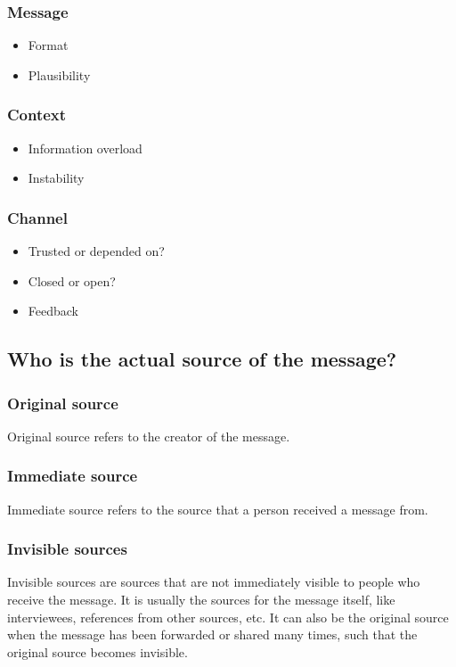 \documentclass[11pt]{article}
\begin{document}
\subsubsection{Message}
\label{sec:org92cbc2b}
\begin{itemize}
\item Format
\item Plausibility
\end{itemize}

\subsubsection{Context}
\label{sec:orgc5d2cc6}
\begin{itemize}
\item Information overload
\item Instability
\end{itemize}

\subsubsection{Channel}
\label{sec:org3faadb5}
\begin{itemize}
\item Trusted or depended on?
\item Closed or open?
\item Feedback
\end{itemize}

\subsection{Who is the actual source of the message?}
\label{sec:orga968138}

\subsubsection{Original source}
\label{sec:org730b3fd}
Original source refers to the creator of the message.

\subsubsection{Immediate source}
\label{sec:org5d2ad3b}
Immediate source refers to the source that a person received a message from.

\subsubsection{Invisible sources}
\label{sec:org89c842a}
Invisible sources are sources that are not immediately visible to people who receive the message. It is usually the sources for the message itself, like interviewees, references from other sources, etc. It can also be the original source when the message has been forwarded or shared many times, such that the original source becomes invisible.
\end{document}
